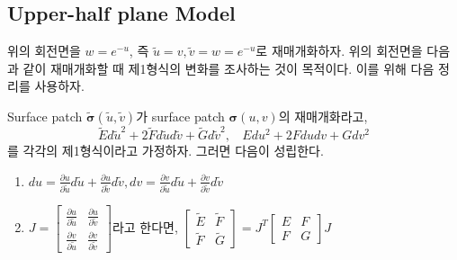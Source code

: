 \documentclass[10pt,a4paper]{article}
\begin{document}
%
%
\subsection{Upper-half plane Model}

위의 회전면을 $w = e^{-u}$, 즉 $\tilde{u} = v, \tilde{v}=w=e^{-u}$로 재매개화하자. 위의 회전면을 다음과 같이 재매개화할 때 제1형식의 변화를 조사하는 것이 목적이다. 이를 위해 다음 정리를 사용하자.
\begin{tcolorbox}[title=재매개화로 인한 제1형식 변화]
Surface patch $\tilde{\boldsymbol{\sigma}}(\tilde{u},\tilde{v})$가 surface patch $\boldsymbol{\sigma}(u,v)$의 재매개화라고, \[ \tilde{E}d\tilde{u}^{2}+2\tilde{F}d\tilde{u}d\tilde{v}+\tilde{G}d\tilde{v}^{2}, \ \ \ \  Edu^{2} + 2Fdudv + Gdv^{2} \]를 각각의 제1형식이라고 가정하자. 그러면 다음이 성립한다.
\begin{enumerate}
    \item $\displaystyle du = \frac{\partial u}{\partial \tilde{u}}d\tilde{u} + \frac{\partial u}{\partial \tilde{v}}d\tilde{v}, dv = \frac{\partial v}{\partial \tilde{u}}d\tilde{u} + \frac{\partial v}{\partial \tilde{v}}d\tilde{v}$ 
    \item $\displaystyle J = \begin{bmatrix}
        \frac{\partial u}{\partial \tilde{u}} & \frac{\partial u}{\partial \tilde{v}} \\
        \frac{\partial v}{\partial \tilde{u}} & \frac{\partial v}{\partial \tilde{v}}
    \end{bmatrix}$라고 한다면, $\begin{bmatrix}\tilde{E} & \tilde{F} \\ \tilde{F} & \tilde{G} \end{bmatrix} = J^{T}\begin{bmatrix}E & F\\F&G \end{bmatrix} J$
\end{enumerate}
\end{tcolorbox}
\end{document}
